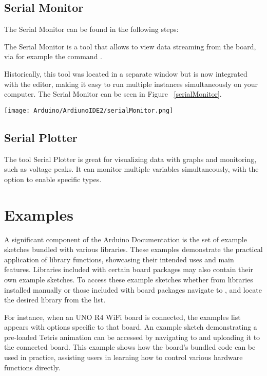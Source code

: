 {\subsection{Serial Monitor}


The Serial Monitor can be found in the following steps: 

The Serial Monitor is a tool that allows to view data streaming from the board, via for example the command .

Historically, this tool was located in a separate window but is now integrated with the editor, making it easy to run multiple instances simultaneously on your computer. The Serial Monitor can be seen in Figure  ~\ref{serialMonitor}.


\begin{center}
        \texttt{[image: Arduino/ArdiunoIDE2/serialMonitor.png]}
        \label{serialMonitor}
\end{center}


\subsection{Serial Plotter}

The tool Serial Plotter is great for visualizing data with graphs and monitoring, such as voltage peaks. It can monitor multiple variables simultaneously, with the option to enable specific types.


\section{Examples}

A significant component of the Arduino Documentation is the set of example sketches bundled with various libraries. These examples demonstrate the practical application of library functions, showcasing their intended uses and main features. Libraries included with certain board packages may also contain their own example sketches.
To access these example sketches whether from libraries installed manually or those included with board packages navigate to , and locate the desired library from the list.

For instance, when an UNO R4 WiFi board is connected, the examples list appears with options specific to that board. An example sketch demonstrating a pre-loaded Tetris animation can be accessed by navigating to  and uploading it to the connected board. This example shows how the board’s bundled code can be used in practice, assisting users in learning how to control various hardware functions directly. 

}
